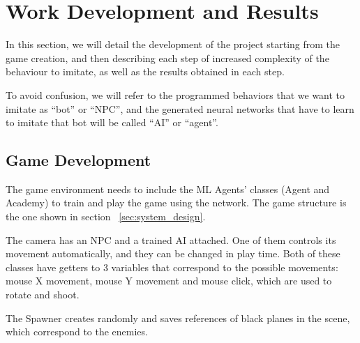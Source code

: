 %
%
%

\chapter{Work Development and Results}

\minitoc{}

\bigskip{}

In this section, we will detail the development of the project starting from the game creation, and then describing each step of increased complexity of the behaviour to imitate, as well as the results obtained in each step. 

To avoid confusion, we will refer to the programmed behaviors that we want to imitate as ``bot'' or ``NPC'', and the generated neural networks that have to learn to imitate that bot will be called ``AI'' or ``agent''.

\section{Game Development}

The game environment needs to include the ML Agents' classes (Agent and Academy) to train and play the game using the network. The game structure is the one shown in section ~\ref{sec:system_design}.

The camera has an NPC and a trained AI attached. One of them controls its movement automatically, and they can be changed in play time. Both of these classes have getters to 3 variables that correspond to the possible movements: mouse X movement, mouse Y movement and mouse click, which are used to rotate and shoot.

The Spawner creates randomly and saves references of black planes in the scene, which correspond to the enemies.

